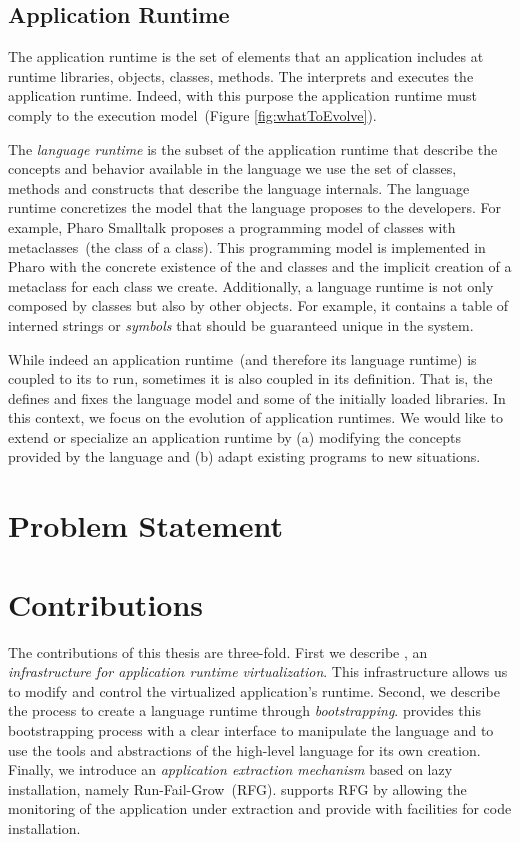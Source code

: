\subsection{Application Runtime}

The application runtime is the set of elements that an application includes at runtime \eg libraries, objects, classes, methods. The \VM interprets and executes the application runtime. Indeed, with this purpose the application runtime must comply to the \VM execution model~(Figure \ref{fig:whatToEvolve}).

The \emph{language runtime} is the subset of the application runtime that describe the concepts and behavior available in the language we use \ie the set of classes, methods and constructs that describe the language internals. The language runtime concretizes the model that the language proposes to the developers. For example, Pharo Smalltalk proposes a programming model of classes with metaclasses~(the class of a class). This programming model is implemented in Pharo with the concrete existence of the  and  classes and the implicit creation of a metaclass for each class we create. Additionally, a language runtime is not only composed by classes but also by other objects. For example, it contains a table of interned strings or \emph{symbols} that should be guaranteed unique in the system.

While indeed an application runtime~(and therefore its language runtime) is coupled to its \VM to run, sometimes it is also coupled in its definition. That is, the \VM defines and fixes the language model and some of the initially loaded libraries. In this context, we focus on the evolution of application runtimes. We would like to extend or specialize an application runtime by (a) modifying the concepts provided by the language and (b) adapt existing programs to new situations.

\section{Problem Statement}


\section{Contributions}

The contributions of this thesis are three-fold. First we describe \Vtt, an \emph{infrastructure for application runtime virtualization}. This infrastructure allows us to modify and control the virtualized application's runtime.
Second, we describe the process to create a language runtime through \emph{bootstrapping}. \Vtt provides this bootstrapping process with a clear interface  to manipulate the language and to use the tools and abstractions of the high-level language for its own creation.
Finally, we introduce an \emph{application extraction mechanism} based on lazy installation, namely Run-Fail-Grow~(RFG). \Vtt supports RFG by allowing the monitoring of the application under extraction and provide with facilities for code installation.

